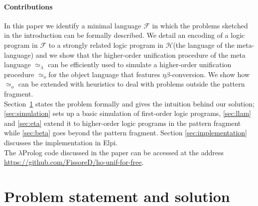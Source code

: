 \documentclass[sigconf,natbib=false,review]{acmart}
\def\githubUrl{\url{https://github.com/FissoreD/ho-unif-for-free}}
\newcommand{\UnifRel}{\ensuremath{\simeq}}
\newcommand{\Uo}{\texorpdfstring{\ensuremath{\UnifRel_o}\xspace}{unif\_o}}
\newcommand{\Ue}{\ensuremath{\UnifRel_\lambda}\xspace}
\newcommand{\llambda}{\ensuremath{\mathcal{L}}\xspace}
\newcommand{\Fo}{\texorpdfstring{\ensuremath{\mathcal{F}\xspace}}{F}} %
\newcommand{\Ho}{\texorpdfstring{\ensuremath{\mathcal{H}}\xspace}{H}}
\begin{document}
\paragraph{Contributions}
In this paper we identify a minimal language \Fo{} in which the problems
sketched in the introduction can be formally described.
We detail an encoding of a logic program in \Fo{} to a strongly related
logic program in \Ho (the language of the meta-language) and we show that
the higher-order unification procedure of the meta language \Ue{} can be
efficiently used to simulate a higher-order unification procedure \Uo for
the object language that features $\eta\beta$-conversion. We show how \Uo
can be extended with heuristics to deal with problems outside the pattern
fragment.\\
Section~\ref{sec:problem-statement} states the problem formally and gives the
intuition behind our solution; \cref{sec:simulation} sets up a basic
simulation of first-order logic programs, \cref{sec:llam} and \cref{sec:eta}
extend it to higher-order logic programs in the pattern fragment
while \cref{sec:beta} goes beyond the pattern fragment.
Section \ref{sec:implementation} discusses the implementation in Elpi.\\
The $\lambda$Prolog code discussed in the paper can be accessed at the
address \githubUrl.

\section{Problem statement and solution} %
\label{sec:problem-statement}

\newcommand{\specunif}[3]{
  \{#3_1, #3_2\} \subseteq \llambda \Rightarrow %
    \exists \rho, %
      \rho #3_1 #1 \rho #3_2  %
        \Leftrightarrow #3_1 #2 #3_2 \mapsto \rho' \subseteq \rho
}


\newcommand{\unifcorrectX}[4]{\ensuremath{
   #4 \Rightarrow
      #3_1 #2 #3_2 \mapsto \rho
        \Rightarrow
          \rho #3_1 #1 \rho #3_2  %
}}
\newcommand{\unifcorrect}[3]{\unifcorrectX{#1}{#2}{#3}{ \{#3_1, #3_2\} \subseteq \llambda}}

\newcommand{\unifcompleteX}[4]{\ensuremath{
    #4 \Rightarrow
        \rho #3_1 #1 \rho #3_2  %
          \Rightarrow \exists \rho', #3_1 #2 #3_2 \mapsto \rho' \land \rho' \subseteq \rho
}}
\newcommand{\unifcomplete}[3]{\unifcompleteX{#1}{#2}{#3}{\{#3_1, #3_2\} \subseteq \llambda}}
\end{document}
